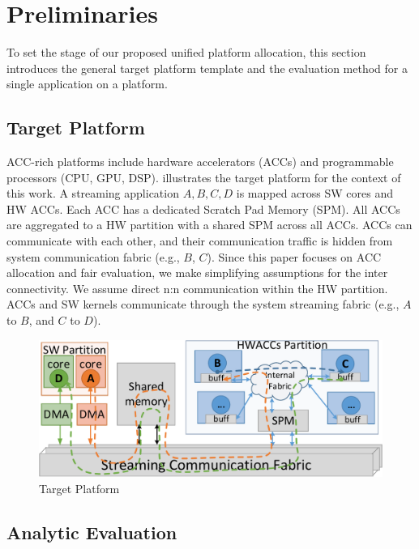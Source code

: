 \vspace{-2pt}
\section{Preliminaries}
\label{sec:pre}

To set the stage of our proposed unified platform allocation, this section introduces the general target platform template and the evaluation method for a single application on a platform.


\subsection{Target Platform}

ACC-rich platforms include hardware accelerators (ACCs) and programmable processors (CPU, GPU, DSP).  illustrates the target platform for the context of this work. A streaming application $A, B, C, D$ is mapped across SW cores and HW ACCs. 
Each ACC has a dedicated Scratch Pad Memory (SPM). 
All ACCs are aggregated to a HW partition with a shared SPM across all ACCs. ACCs can communicate with each other, and their communication traffic is hidden from system communication fabric (e.g., $B$, $C$). 
Since this paper focuses on ACC allocation and fair evaluation, we make simplifying assumptions for the inter connectivity. 
We assume direct n:n communication within the HW partition. 
ACCs and SW kernels communicate through the system streaming fabric (e.g., $A$ to $B$, and $C$ to $D$).

\vspace{-2pt}
\begin{figure}[h]
	\centering
	\includegraphics[width=.8\linewidth]{fig/pPlat.pdf}
	\vspace{-4pt}
	\caption{Target Platform}
	\label{fig:plat}
	\vspace{-8pt}
\end{figure}


\vspace{-4pt}
\subsection{Analytic Evaluation}
\label{subsec:ana}

